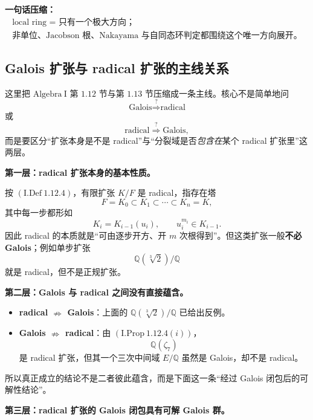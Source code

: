 \documentclass[a4paper]{ctexart}
\theoremstyle{definition}
\theoremstyle{analysis}
\theoremstyle{plain}
\begin{document}
\medskip

\textbf{一句话压缩：}
\[
  \boxed{
    \begin{array}{c}
      \text{local ring = 只有一个极大方向；}\\
      \text{非单位、Jacobson 根、Nakayama 与自同态环判定都围绕这个唯一方向展开。}
    \end{array}
  }
\]

\subsection{\texorpdfstring{Galois 扩张与 radical 扩张的主线关系}{Galois 扩张与 radical 扩张的主线关系}}\label{subsec:topic-galois-radical}

这里把 \(\mathrm{Algebra\ I}\) 第 \(1.12\) 节与第 \(1.13\) 节压缩成一条主线。核心不是简单地问
\[
  \text{Galois}\overset{?}{\Longrightarrow}\text{radical}
\]
或
\[
  \text{radical}\overset{?}{\Longrightarrow}\text{Galois},
\]
而是要区分“扩张本身是不是 radical”与“分裂域是否\emph{包含在}某个 radical 扩张里”这两层。

\medskip

\textbf{第一层：radical 扩张本身的基本性质。}

按 \((\mathrm{I.Def}\ 1.12.4)\)，有限扩张 \(K/F\) 是 radical，指存在塔
\[
  F=K_0\subset K_1\subset\cdots\subset K_n=K,
\]
其中每一步都形如
\[
  K_i=K_{i-1}(u_i),\qquad u_i^{m_i}\in K_{i-1}.
\]
因此 radical 的本质就是“可由逐步开方、开 \(m\) 次根得到”。但这类扩张一般\textbf{不必 Galois}；例如单步扩张
\[
  \mathbb Q(\sqrt[3]{2})/\mathbb Q
\]
就是 radical，但不是正规扩张。

\medskip

\textbf{第二层：Galois 与 radical 之间没有直接蕴含。}

\begin{itemize}
  \item \textbf{radical \(\nRightarrow\) Galois}：上面的 \(\mathbb Q(\sqrt[3]{2})/\mathbb Q\) 已给出反例。
  \item \textbf{Galois \(\nRightarrow\) radical}：由 \((\mathrm{I.Prop}\ 1.12.4(i))\)，
  \[
    \mathbb Q(\zeta_7)
  \]
  是 radical 扩张，但其一个三次中间域 \(E/\mathbb Q\) 虽然是 Galois，却不是 radical。
\end{itemize}

所以真正成立的结论不是二者彼此蕴含，而是下面这一条“经过 Galois 闭包后的可解性结论”。

\medskip

\textbf{第三层：radical 扩张的 Galois 闭包具有可解 Galois 群。}
\end{document}
